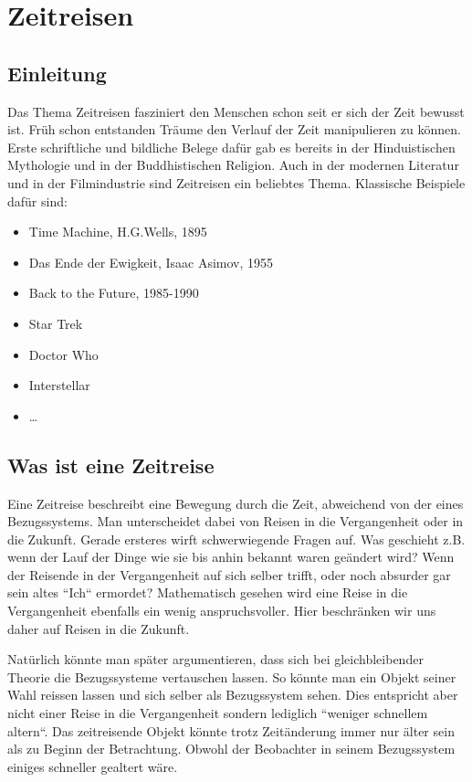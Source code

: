 \chapter{Zeitreisen\label{chapter:thema}}
\begin{refsection}

\section{Einleitung}

Das Thema Zeitreisen fasziniert den Menschen schon seit er sich der Zeit bewusst ist. Früh schon entstanden Träume den Verlauf der Zeit manipulieren zu können. Erste schriftliche und bildliche Belege dafür gab es bereits in der Hinduistischen Mythologie und in der Buddhistischen Religion. Auch in der modernen Literatur und in der Filmindustrie sind Zeitreisen ein beliebtes Thema. Klassische Beispiele daf\"ur sind: 

\begin{itemize}
    \item Time Machine, H.G.Wells, 1895 
    \item Das Ende der Ewigkeit, Isaac Asimov, 1955
    \item Back to the Future, 1985-1990
    \item Star Trek
    \item Doctor Who
    \item Interstellar
    \item \ldots
\end{itemize}

\section{Was ist eine Zeitreise}

Eine Zeitreise beschreibt eine Bewegung durch die Zeit, abweichend von der eines Bezugssystems. Man unterscheidet dabei von Reisen in die Vergangenheit oder in die Zukunft. Gerade ersteres wirft schwerwiegende Fragen auf. Was geschieht z.B. wenn der Lauf der Dinge wie sie bis anhin bekannt waren geändert wird? Wenn der Reisende in der Vergangenheit auf sich selber trifft, oder noch absurder gar sein altes ``Ich`` ermordet? 
Mathematisch gesehen wird eine Reise in die Vergangenheit ebenfalls ein wenig anspruchsvoller. Hier beschränken wir uns daher auf Reisen in die Zukunft. 

Natürlich könnte man später argumentieren, dass sich bei gleichbleibender Theorie die Bezugssysteme vertauschen lassen. So könnte man ein Objekt seiner Wahl reissen lassen und sich selber als Bezugssystem sehen. Dies entspricht aber nicht einer Reise in die Vergangenheit sondern lediglich ``weniger schnellem altern``. Das zeitreisende  Objekt könnte trotz Zeit\"anderung immer nur älter sein als zu Beginn der Betrachtung. Obwohl der Beobachter in seinem Bezugssystem einiges schneller gealtert wäre.


\end{refsection}
